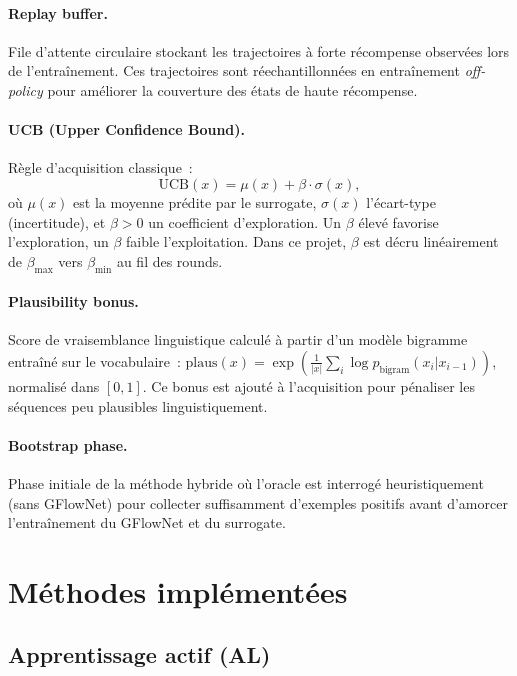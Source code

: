 \documentclass[10pt]{article}
\begin{document}
\paragraph{Replay buffer.}
File d'attente circulaire stockant les trajectoires à forte récompense observées lors de l'entraînement. Ces trajectoires sont réechantillonnées en entraînement \emph{off-policy} pour améliorer la couverture des états de haute récompense.

\paragraph{UCB (Upper Confidence Bound).}
Règle d'acquisition classique~:
\[
  \text{UCB}(x) = \mu(x) + \beta \cdot \sigma(x),
\]
où $\mu(x)$ est la moyenne prédite par le surrogate, $\sigma(x)$ l'écart-type (incertitude), et $\beta > 0$ un coefficient d'exploration. Un $\beta$ élevé favorise l'exploration, un $\beta$ faible l'exploitation. Dans ce projet, $\beta$ est décru linéairement de $\beta_{\max}$ vers $\beta_{\min}$ au fil des rounds.

\paragraph{Plausibility bonus.}
Score de vraisemblance linguistique calculé à partir d'un modèle bigramme entraîné sur le vocabulaire~: $\text{plaus}(x) = \exp\!\left(\frac{1}{|x|}\sum_i \log p_{\text{bigram}}(x_i|x_{i-1})\right)$, normalisé dans $[0,1]$. Ce bonus est ajouté à l'acquisition pour pénaliser les séquences peu plausibles linguistiquement.

\paragraph{Bootstrap phase.}
Phase initiale de la méthode hybride où l'oracle est interrogé heuristiquement (sans GFlowNet) pour collecter suffisamment d'exemples positifs avant d'amorcer l'entraînement du GFlowNet et du surrogate.

\section{Méthodes implémentées}

\subsection{Apprentissage actif (AL)}
\end{document}
